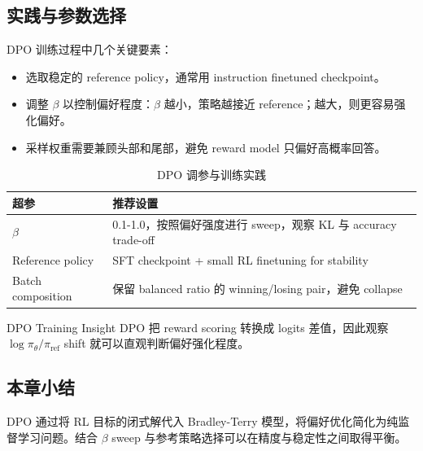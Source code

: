 \subsection{实践与参数选择}

DPO 训练过程中几个关键要素：
\begin{itemize}
    \item 选取稳定的 reference policy，通常用 instruction finetuned checkpoint。
    \item 调整 $\beta$ 以控制偏好程度：$\beta$ 越小，策略越接近 reference；越大，则更容易强化偏好。
    \item 采样权重需要兼顾头部和尾部，避免 reward model 只偏好高概率回答。
\end{itemize}

\begin{table}[H]
\centering
\begin{tabular}{p{} p{}}
\toprule
超参 & 推荐设置 \\
\midrule
$\beta$ & 0.1-1.0，按照偏好强度进行 sweep，观察 KL 与 accuracy trade-off \\
Reference policy & SFT checkpoint + small RL finetuning for stability \\
Batch composition & 保留 balanced ratio 的 winning/losing pair，避免 collapse \\
\bottomrule
\end{tabular}
\caption{DPO 调参与训练实践}
\end{table}

\begin{knowledgebox}{DPO Training Insight}
DPO 把 reward scoring 转换成 logits 差值，因此观察 $\log \pi_\theta / \pi_{\mathrm{ref}}$ shift 就可以直观判断偏好强化程度。
\end{knowledgebox}

\subsection{本章小结}

DPO 通过将 RL 目标的闭式解代入 Bradley-Terry 模型，将偏好优化简化为纯监督学习问题。结合 $\beta$ sweep 与参考策略选择可以在精度与稳定性之间取得平衡。

